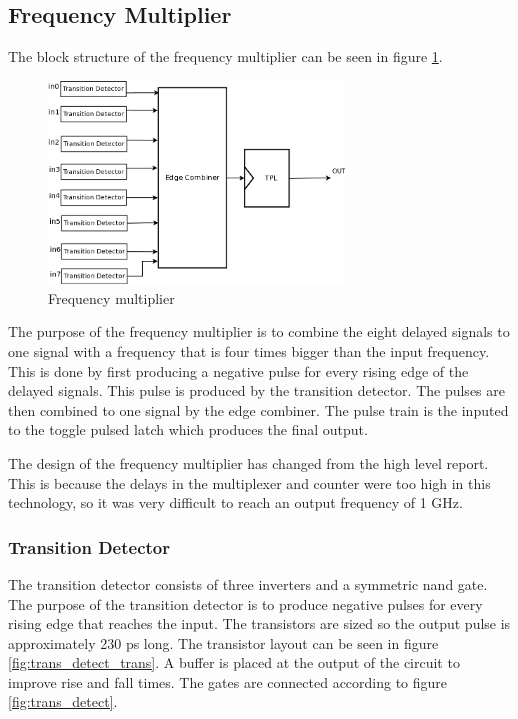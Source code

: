 \documentclass[a4paper,12pt]{article} \usepackage{graphicx}
\begin{document}
\subsection{Frequency Multiplier}
The block structure of the frequency multiplier can be seen in figure 
\ref{fig:freq_mult}.
\begin{figure}[p]
        \centering
        \includegraphics[width=0.7\textwidth]{../Bilder/freq_mult_trans.png}
        \caption{Frequency multiplier}
        \label{fig:freq_mult}
\end{figure}

The purpose of the frequency multiplier is to combine the eight delayed signals
to one signal with a frequency that is four times bigger than the input
frequency. This is done by first producing a negative pulse for every rising
edge of the delayed signals. This pulse is produced by the transition detector.
The pulses are then combined to one signal by the edge combiner. The pulse
train is the inputed to the toggle pulsed latch which produces the final output.

The design of the frequency multiplier has changed from the high level report.
This is because the delays in the multiplexer and counter were too high in this
technology, so it was very difficult to reach an output frequency of 1 GHz.

\subsubsection{Transition Detector}
\label{sec:trans_detect}
The transition detector consists of three inverters and a symmetric nand gate.
The purpose of the transition detector is to produce negative pulses for every
rising edge that reaches the input. The transistors are sized so the output
pulse is approximately 230 ps long. The transistor layout can be seen
in figure \ref{fig:trans_detect_trans}.
A buffer is placed at the output of the circuit to improve rise and fall times.
The gates are connected according to figure \ref{fig:trans_detect}.
\end{document}
